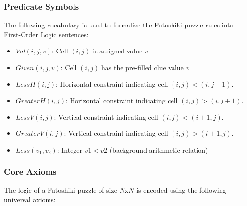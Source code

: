 \subsubsection{Predicate Symbols}
The following vocabulary is used to formalize the Futoshiki puzzle rules into First-Order Logic sentences:
\begin{itemize}
    \item $Val(i, j, v)$: Cell $(i, j)$ is assigned value $v$
    \item $Given(i, j, v)$: Cell $(i, j)$ has the pre-filled clue value $v$
    \item $LessH(i, j)$: Horizontal constraint indicating cell $(i, j) < (i, j+1)$.
    \item $GreaterH(i, j)$: Horizontal constraint indicating cell $(i, j) > (i, j+1)$.
    \item $LessV(i, j)$: Vertical constraint indicating cell $(i, j) < (i+1, j)$.
    \item $GreaterV(i, j)$: Vertical constraint indicating cell $(i, j) > (i+1, j)$.
    \item $Less(v_1, v_2)$:  Integer $v1 < v2$ (background arithmetic relation)
\end{itemize}

\subsubsection{Core Axioms}
The logic of a Futoshiki puzzle of size $N$x$N$ is encoded using the following universal axioms:

